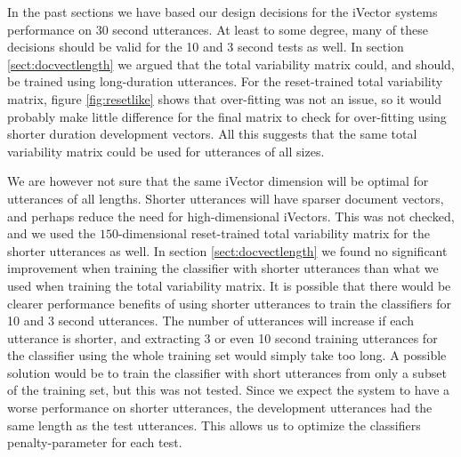 In the past sections we have based our design decisions for the iVector systems performance on 30 second utterances. At least to some degree, many of these decisions should be valid for the 10 and 3 second tests as well. In section \ref{sect:docvectlength} we argued that the total variability matrix could, and should, be trained using long-duration utterances. For the reset-trained total variability matrix, figure \ref{fig:resetlike} shows that over-fitting was not an issue, so it would probably make little difference for the final matrix to check for over-fitting using shorter duration development vectors. All this suggests that the same total variability matrix could be used for utterances of all sizes. 

We are however not sure that the same iVector dimension will be optimal for utterances of all lengths. Shorter utterances will have sparser document vectors, and perhaps reduce the need for high-dimensional iVectors. This was not checked, and we used the $150$-dimensional reset-trained total variability matrix for the shorter utterances as well. In section \ref{sect:docvectlength} we found no significant improvement when training the classifier with shorter utterances than what we used when training the total variability matrix. It is possible that there would be clearer performance benefits of using shorter utterances to train the classifiers for 10 and 3 second utterances. The number of utterances will increase if each utterance is shorter, and extracting 3 or even 10 second training utterances for the classifier using the whole training set would simply take too long. A possible solution would be to train the classifier with short utterances from only a subset of the training set, but this was not tested. Since we expect the system to have a worse performance on shorter utterances, the development utterances had the same length as the test utterances.  This allows us to optimize the classifiers penalty-parameter for each test. 


















